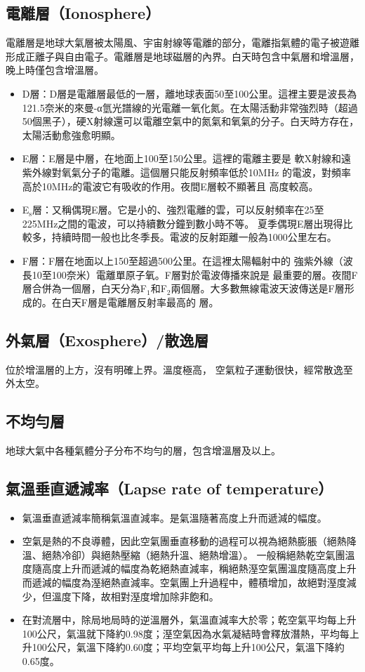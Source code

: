 \documentclass[a4paper,12pt]{report}
\begin{document}
\subsection{電離層（Ionosphere）}
電離層是地球大氣層被太陽風、宇宙射線等電離的部分，電離指氣體的電子被遊離形成正離子與自由電子。電離層是地球磁層的內界。白天時包含中氣層和增溫層，晚上時僅包含增溫層。
\begin{itemize}
  \item D層：D層是電離層最低的一層，離地球表面50至100公里。這裡主要是波長為121.5奈米的來曼-α氫光譜線的光電離一氧化氮。在太陽活動非常強烈時（超過50個黑子），硬X射線還可以電離空氣中的氮氣和氧氣的分子。白天時方存在，太陽活動愈強愈明顯。
  \item E層：E層是中層，在地面上100至150公里。這裡的電離主要是 軟X射線和遠紫外線對氧氣分子的電離。這個層只能反射頻率低於10MHz 的電波，對頻率高於10MHz的電波它有吸收的作用。夜間E層較不顯著且 高度較高。
  \item E$_\text{s}$層：又稱偶現E層。它是小的、強烈電離的雲，可以反射頻率在25至225MHz之間的電波，可以持續數分鐘到數小時不等。 夏季偶現E層出現得比較多，持續時間一般也比冬季長。電波的反射距離一般為1000公里左右。
  \item F層：F層在地面以上150至超過500公里。在這裡太陽輻射中的 強紫外線（波長10至100奈米）電離單原子氧。F層對於電波傳播來說是 最重要的層。夜間F層合併為一個層，白天分為F$_1$和F$_2$兩個層。大多數無線電波天波傳送是F層形成的。在白天F層是電離層反射率最高的 層。
\end{itemize}
\subsection{外氣層（Exosphere）/散逸層}
位於增溫層的上方，沒有明確上界。溫度極高， 空氣粒子運動很快，經常散逸至外太空。
\subsection{不均勻層}
地球大氣中各種氣體分子分布不均勻的層，包含增溫層及以上。
\subsection{氣溫垂直遞減率（Lapse rate of temperature）}
\begin{itemize}
  \item 氣溫垂直遞減率簡稱氣溫直減率。是氣溫隨著高度上升而遞減的幅度。
  \item 空氣是熱的不良導體，因此空氣團垂直移動的過程可以視為絕熱膨脹（絕熱降溫、絕熱冷卻）與絕熱壓縮（絕熱升溫、絕熱增溫）。 一般稱絕熱乾空氣團溫度隨高度上升而遞減的幅度為乾絕熱直減率，稱絕熱溼空氣團溫度隨高度上升而遞減的幅度為溼絕熱直減率。空氣團上升過程中，體積增加，故絕對溼度減少，但溫度下降，故相對溼度增加除非飽和。
  \item 在對流層中，除局地局時的逆溫層外，氣溫直減率大於零；乾空氣平均每上升100公尺，氣溫就下降約0.98度；溼空氣因為水氣凝結時會釋放潛熱，平均每上升100公尺，氣溫下降約0.60度；平均空氣平均每上升100公尺，氣溫下降約0.65度。
\end{itemize}
\end{document}
